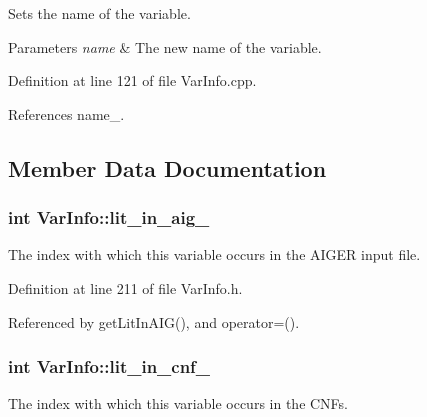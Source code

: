 Sets the name of the variable. 


\begin{DoxyParams}{Parameters}
{\em name} & The new name of the variable. \\
\hline
\end{DoxyParams}


Definition at line 121 of file Var\-Info.\-cpp.



References name\-\_\-.



\subsection{Member Data Documentation}
\hypertarget{classVarInfo_ae0bf3d35787614131a642bea83d30555}{
\subsubsection[{lit\-\_\-in\-\_\-aig\-\_\-}]{\setlength{\rightskip}{0pt plus 5cm}int Var\-Info\-::lit\-\_\-in\-\_\-aig\-\_\-\hspace{0.3cm}{\ttfamily [protected]}}}\label{classVarInfo_ae0bf3d35787614131a642bea83d30555}


The index with which this variable occurs in the A\-I\-G\-E\-R input file. 



Definition at line 211 of file Var\-Info.\-h.



Referenced by get\-Lit\-In\-A\-I\-G(), and operator=().

\hypertarget{classVarInfo_aa9937f8bae554d520b194c4d97df4b64}{
\subsubsection[{lit\-\_\-in\-\_\-cnf\-\_\-}]{\setlength{\rightskip}{0pt plus 5cm}int Var\-Info\-::lit\-\_\-in\-\_\-cnf\-\_\-\hspace{0.3cm}{\ttfamily [protected]}}}\label{classVarInfo_aa9937f8bae554d520b194c4d97df4b64}


The index with which this variable occurs in the C\-N\-Fs. 



